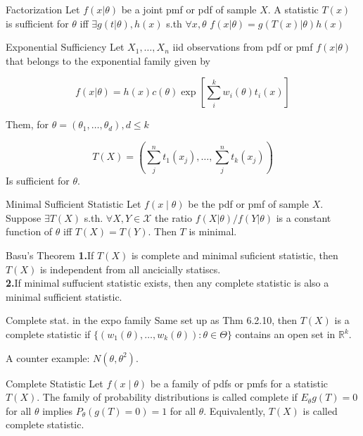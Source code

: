 \documentclass{article}
\begin{document}
\begin{multicols*}{3}
\begin{thmbox}{Factorization}
Let $f(x|\theta)$ be a joint pmf or pdf of sample $X$. A statistic $T(x)$ is sufficient for $\theta$ iff $\exists g(t|\theta), h(x)$ s.th $\forall x,\theta$ $f(x|\theta) = g(T(x)|\theta)h(x)$
\end{thmbox}



\begin{thmbox}{Exponential Sufficiency}
Let $X_1,\dots,X_n$ iid observations from pdf or pmf $f(x|\theta)$ that belongs to the exponential family given by

$$
f(x|\theta) = h(x)c(\theta)\exp\left[\sum_i^kw_i(\theta)t_i(x)\right]
$$

Them, for $\theta = (\theta_1,\dots,\theta_d), d\leq k$

$$
T(X) = \left(\sum_j^n t_1(x_j),\dots,\sum_j^nt_k(x_j)\right)
$$
Is sufficient for $\theta$.
\end{thmbox}

\begin{thmbox}{Minimal Sufficient Statistic}
Let $f(x\mid \theta)$ be the pdf or pmf of sample $X$. Suppose $\exists T(X)$ s.th. $\forall X,Y\in\mathcal{X}$ the ratio $f(X|\theta)/f(Y|\theta)$ is a constant function of $\theta$ iff $T(X) = T(Y)$. Then $T$ is minimal.
\end{thmbox}

\begin{thmbox}{Basu's Theorem}
\textbf{1.}If $T(X)$ is complete and minimal suficient statistic, then $T(X)$ is independent from all ancicially statiscs. \\
\textbf{2.}If minimal suffucient statistic exists, then any complete statistic is also a minimal sufficient statistic.
\end{thmbox}

\begin{thmbox}{Complete stat. in the expo family} Same set up as Thm 6.2.10, then $T(X)$ is a complete statistic if $\{(w_1(\theta),\dots,w_k(\theta)):\theta\in\Theta\}$ contains an open set in $\mathbb{R}^k$.

A counter example: $N(\theta,\theta^2)$.
\end{thmbox}

\begin{thmbox}{Complete Statistic}
Let $f(x\mid \theta)$ be a family of pdfs or pmfs for a statistic $T(X)$. The family of probability distributions is called complete if $E_\theta g(T) = 0$ for all $\theta$ implies $P_\theta(g(T) = 0) = 1$ for all $\theta$. Equivalently, $T(X)$ is called complete statistic.
\end{thmbox}


\end{multicols*}
\end{document}
